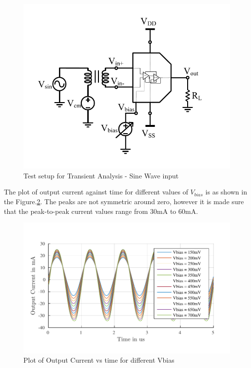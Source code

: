 \begin{figure} [H]
\centering
\includegraphics[scale=1]{Figures/Test_Benches/Overall/SINE.pdf}
\caption{Test setup for Transient Analysis - Sine Wave input}
\label{fig:TB_SINE}
\end{figure}

The plot of output current against time for different values of $V_{bias}$ is as shown in the Figure.\ref{fig:SINE}. The peaks are not symmetric around zero, however it is made sure that the peak-to-peak current values range from 30mA to 60mA.

\begin{figure} [H]
\centering
\includegraphics[scale=1]{Figures/Plots/Ov_Sine_Iout.pdf}
\caption{Plot of Output Current vs time for different Vbias}
\label{fig:SINE}
\end{figure}

